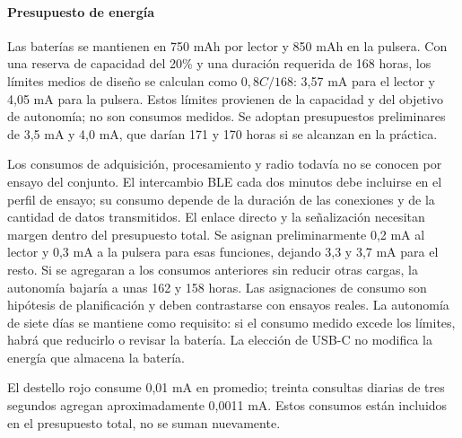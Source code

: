 \paragraph{Presupuesto de energía}
Las baterías se mantienen en 750 mAh por lector y 850 mAh en la pulsera. Con una reserva de capacidad del 20\% y una duración requerida de 168 horas, los límites medios de diseño se calculan como $0{,}8C/168$: 3,57 mA para el lector y 4,05 mA para la pulsera. Estos límites provienen de la capacidad y del objetivo de autonomía; no son consumos medidos. Se adoptan presupuestos preliminares de 3,5 mA y 4,0 mA, que darían 171 y 170 horas si se alcanzan en la práctica.

Los consumos de adquisición, procesamiento y radio todavía no se conocen por ensayo del conjunto. El intercambio BLE cada dos minutos debe incluirse en el perfil de ensayo; su consumo depende de la duración de las conexiones y de la cantidad de datos transmitidos. El enlace directo y la señalización necesitan margen dentro del presupuesto total. Se asignan preliminarmente 0,2 mA al lector y 0,3 mA a la pulsera para esas funciones, dejando 3,3 y 3,7 mA para el resto. Si se agregaran a los consumos anteriores sin reducir otras cargas, la autonomía bajaría a unas 162 y 158 horas. Las asignaciones de consumo son hipótesis de planificación y deben contrastarse con ensayos reales. La autonomía de siete días se mantiene como requisito: si el consumo medido excede los límites, habrá que reducirlo o revisar la batería. La elección de USB-C no modifica la energía que almacena la batería.

El destello rojo consume 0,01 mA en promedio; treinta consultas diarias de tres segundos agregan aproximadamente 0,0011 mA. Estos consumos están incluidos en el presupuesto total, no se suman nuevamente.

